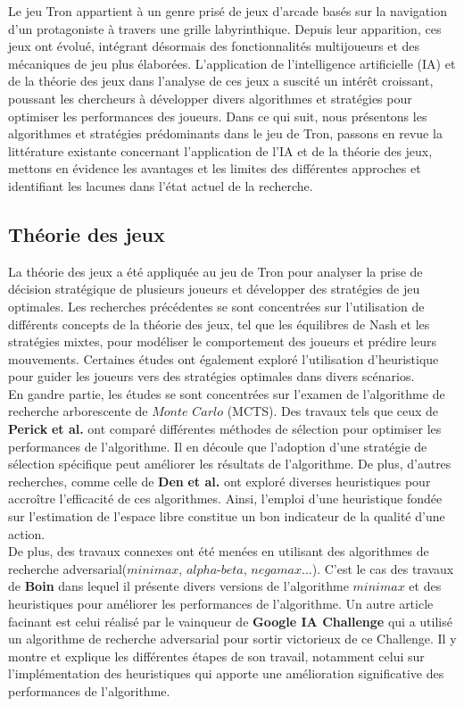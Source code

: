 Le jeu Tron appartient à un genre prisé de jeux d'arcade basés sur la navigation d'un protagoniste à travers une grille labyrinthique. 
Depuis leur apparition, ces jeux ont évolué, intégrant désormais des fonctionnalités multijoueurs et des mécaniques de jeu plus élaborées. 
L'application de l'intelligence artificielle (IA) et de la théorie des jeux dans l'analyse de ces jeux a suscité un intérêt croissant, 
poussant les chercheurs à développer divers algorithmes et stratégies pour optimiser les performances des joueurs. Dans ce qui suit,
nous présentons les algorithmes et stratégies prédominants dans le jeu de Tron, passons en revue la littérature existante concernant l'application de l'IA 
et de la théorie des jeux, mettons en évidence les avantages et les limites des différentes approches et identifiant les lacunes dans l'état actuel 
de la recherche.

\tocless\subsection{Théorie des jeux}
La théorie des jeux a été appliquée au jeu de Tron pour analyser la prise de décision stratégique de plusieurs joueurs 
et développer des stratégies de jeu optimales. Les recherches précédentes se sont concentrées sur l'utilisation de différents 
concepts de la théorie des jeux, tel que les équilibres de Nash et les stratégies mixtes, pour modéliser le comportement des 
joueurs et prédire leurs mouvements. Certaines études ont également exploré l'utilisation 
d'heuristique pour guider les joueurs vers des stratégies optimales dans divers scénarios.\\


En gandre partie, les études se sont concentrées sur l'examen de l'algorithme de recherche arborescente de $Monte$ $Carlo$ (MCTS). 
Des travaux tels que ceux de \textbf{Perick} \textbf{et al.} \cite{perick2012comparison} ont comparé différentes méthodes de sélection 
pour optimiser les performances de l'algorithme. Il en découle que l'adoption d'une stratégie de sélection spécifique peut améliorer les résultats de l'algorithme. 
De plus, d'autres recherches, comme celle de \textbf{Den} \textbf{et al.} \cite{den2011monte} ont exploré diverses heuristiques pour accroître l'efficacité de
ces algorithmes. Ainsi, l'emploi d'une heuristique fondée sur l'estimation de l'espace libre constitue un bon indicateur de la qualité d'une action.\\

De plus, des travaux connexes ont été menées  en utilisant des algorithmes de recherche adversarial($minimax$, $alpha$-$beta$, $negamax$...). 
C'est le cas des travaux de \textbf{Boin}\cite{boincs221} dans lequel il présente divers versions de l'algorithme $minimax$ et des 
heuristiques pour améliorer les performances de l'algorithme. Un autre article facinant est celui réalisé par le vainqueur de 
\textbf{Google IA Challenge} \cite{sloane_2010} qui a utilisé un algorithme de recherche adversarial pour sortir victorieux de ce Challenge.
Il y montre et explique les différentes étapes de son travail, notamment celui sur l'implémentation des heuristiques qui apporte une 
amélioration significative des performances de l'algorithme.\\


